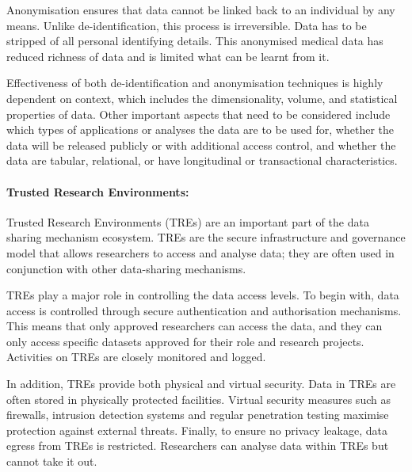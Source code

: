 \documentclass[11pt]{article}
\begin{document}
Anonymisation ensures that data cannot be linked back to an individual by any means. Unlike de-identification, this process is irreversible. Data has to be stripped of all personal identifying details. This anonymised medical data has reduced richness of data and is limited what can be learnt from it. 


Effectiveness of both de-identification and anonymisation techniques is highly dependent on context, which includes the dimensionality, volume, and statistical properties of data. Other important aspects that need to be considered include which types of applications or analyses the data are to be used for, whether the data will be released publicly or with additional access control, and whether the data are tabular, relational, or have longitudinal or transactional characteristics.

\paragraph{Trusted Research Environments:}

Trusted Research Environments (TREs) are an important part of the data sharing mechanism ecosystem. TREs are the secure infrastructure and governance model that allows researchers to access and analyse data; they are often used in conjunction with other data-sharing mechanisms.

TREs play a major role in controlling the data access levels. To begin with, data access is controlled through secure authentication and authorisation mechanisms. This means that only approved researchers can access the data, and they can only access specific datasets approved for their role and research projects. Activities on TREs are closely monitored and logged.

In addition, TREs provide both physical and virtual security. Data in TREs are often stored in physically protected facilities. Virtual security measures such as firewalls, intrusion detection systems and regular penetration testing maximise protection against external threats.  Finally, to ensure no privacy leakage, data egress from TREs is restricted. Researchers can analyse data within TREs but cannot take it out.
\end{document}
